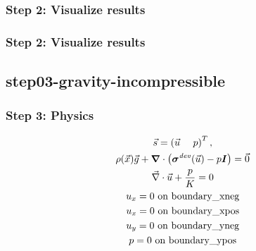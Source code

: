 \documentclass[aspectratio=169]{beamer}
\begin{document}
\begin{frame}
  \frametitle{Step 2: Visualize results}

    
\end{frame}


\begin{frame}
  \frametitle{Step 2: Visualize results}

    
\end{frame}


\subsection{step03-gravity-incompressible}

\begin{frame}
  \frametitle{Step 3: Physics}
  \summary{}

  \begin{minipage}{0.3\textwidth}
    {\scriptsize
    \begin{gather*}
      \vec{s} = \left( \vec{u} \quad \ p \right)^T, \\
      \rho(\vec{x})\vec{g} + \bm{\nabla} \cdot \left(\bm{\sigma}^\mathit{dev}(\vec{u}) - p\bm{I}\right) = \vec{0} \\
      \vec{\nabla} \cdot \vec{u} + \frac{p}{K} = 0 \\
      u_x = 0 \text{ on boundary\_xneg} \\
      u_x = 0 \text{ on boundary\_xpos} \\
      u_y = 0 \text{ on boundary\_yneg} \\
      p = 0 \text{ on boundary\_ypos}
    \end{gather*}}
  \end{minipage}
  \hfill
  \begin{minipage}{0.67\textwidth}
  \end{minipage}
      
\end{frame}
\end{document}
